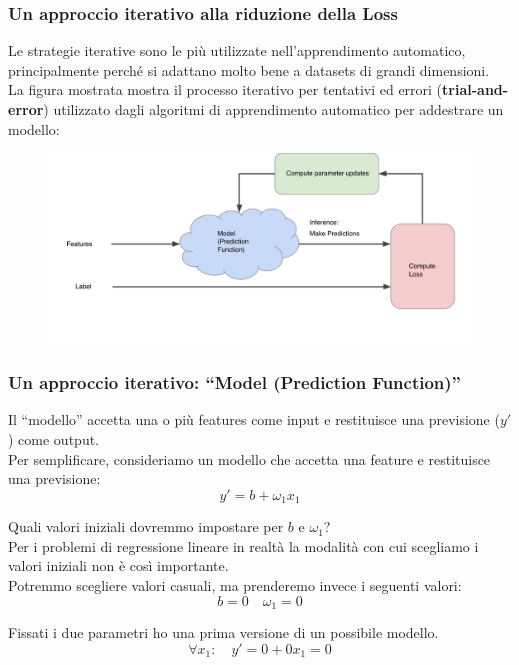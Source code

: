 \begin{frame}

	\frametitle{Un approccio iterativo alla riduzione della Loss}

		Le strategie iterative sono le più utilizzate nell'apprendimento automatico, principalmente perché si adattano molto bene a datasets di grandi dimensioni.\\
		La figura mostrata mostra il processo iterativo per tentativi ed errori (\textbf{trial-and-error}) utilizzato dagli algoritmi di apprendimento automatico per addestrare un modello:

		\begin{figure}[!htbp]
			\centering
			\includegraphics[width=0.8\linewidth]{images/supervised/training_reducing_loss/GradientDescentDiagram.pdf}
			\end{figure}


\end{frame}



\begin{frame}

	\frametitle{Un approccio iterativo: {\color{GradientDescentDiagramBlue}``Model (Prediction Function)''}}

		Il ``modello'' accetta una o più features come input e restituisce una previsione ($y'$) come output.\\
		Per semplificare, consideriamo un modello che accetta una feature e restituisce una previsione:
		$$y' = b + \omega_1x_1$$

		Quali valori iniziali dovremmo impostare per $b$ e $\omega_1$?\\
		Per i problemi di regressione lineare in realtà la modalità con cui scegliamo i valori iniziali non è così importante.\\
		Potremmo scegliere valori casuali, ma prenderemo invece i seguenti valori:
		$$b = 0 \quad \omega_1 = 0$$

		Fissati i due parametri ho una prima versione di un possibile modello.
		$$\forall x_1: \quad y' = 0 + 0x_1 = 0$$

\end{frame}


